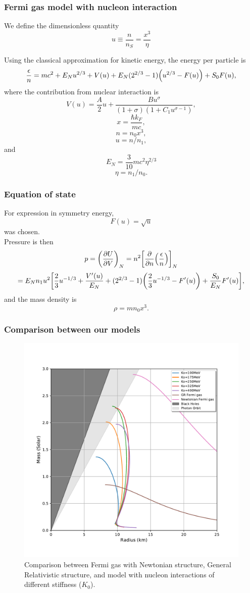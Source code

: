 \documentclass[hperref={pdfpagelabels=false}]{beamer}
\begin{document}
\begin{frame}
 \frametitle{Fermi gas model with nucleon interaction}
 We define the dimensionless quantity \[u\equiv\frac{n}{n_{S}}=\frac{x^{3}}{\eta}\] %
 
 Using the classical approximation for kinetic energy, the energy per particle is
 \[\frac{\epsilon}{n}=mc^{2}+E_{N}u^{2/3}+V(u)+E_{N}(2^{2/3}-1)\qty(u^{2/3}-F(u))+S_{0}F(u),\]
 where the contribution from nuclear interaction is
 \[V(u)=\frac{A}{2}u+\frac{Bu^{\sigma}}{(1+\sigma)(1+C_{1}u^{\sigma-1})},\]
\[x=\frac{\hbar k_{F}}{mc},\]
 \[n=n_{0}x^{3},\]
 \[u=n/n_{1},\]
 and
 \[E_{N}=\frac{3}{10}mc^{2}\eta^{2/3}\]
 \[\eta=n_{1}/n_{0}.\]
\end{frame}

\begin{frame}
\frametitle{Equation of state}
 For expression in symmetry energy,
 \[F(u)=\sqrt{u}\]
 was chosen.\\
 Pressure is then 
 \[p=\qty(\pdv{U}{V})_{N}=n^{2}\qty[\pdv{n}(\frac{\epsilon}{n})]_{N}\]
 \[=E_{N}n_{1}u^{2}\qty[\frac{2}{3}u^{-1/3}+\frac{V'(u)}{E_{N}}+(2^{2/3}-1)\qty(\frac{2}{3}u^{-1/3}-F'(u))+\frac{S_{0}}{E_{N}}F'(u)],\]
 and the mass density is
 \[\rho=mn_{0}x^{3}.\]
\end{frame}

\begin{frame}
 \frametitle{Comparison between our models}
 \begin{figure}
    \includegraphics[scale=0.3]{eos_compare_our_model.pdf}
    \caption{Comparison between Fermi gas with Newtonian structure, General Relativistic structure, and model with nucleon interactions of different stiffness ($K_{0}$).}\label{fig/ourmodel}
  \end{figure}
\end{frame}
\end{document}
